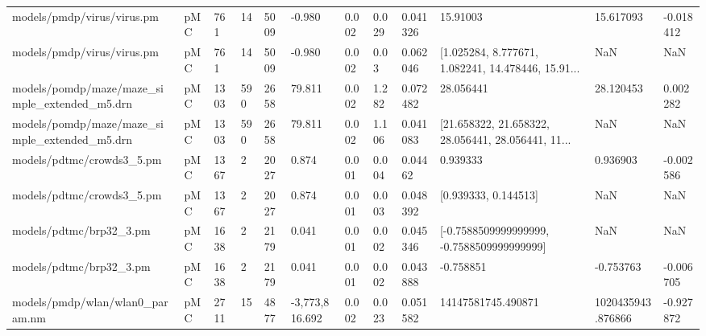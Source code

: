 \begin{tabular}{llllllllllll}
                        models/pmdp/virus/virus.pm &  pMC &    761 &         14 &        5009 &         -0.980 &            0.002 &                        0.029 &       0.041326 &                                           15.91003 &          15.617093 &    -0.018412 \\
                        models/pmdp/virus/virus.pm &  pMC &    761 &         14 &        5009 &         -0.980 &            0.002 &                         0.03 &       0.062046 & [1.025284, 8.777671, 1.082241, 14.478446, 15.91... &                NaN &          NaN \\
     models/pomdp/maze/maze\_simple\_extended\_m5.drn &  pMC &   1303 &        590 &        2658 &         79.811 &            0.002 &                        1.282 &       0.072482 &                                          28.056441 &          28.120453 &     0.002282 \\
     models/pomdp/maze/maze\_simple\_extended\_m5.drn &  pMC &   1303 &        590 &        2658 &         79.811 &            0.002 &                        1.106 &       0.041083 & [21.658322, 21.658322, 28.056441, 28.056441, 11... &                NaN &          NaN \\
                         models/pdtmc/crowds3\_5.pm &  pMC &   1367 &          2 &        2027 &          0.874 &            0.001 &                        0.004 &        0.04462 &                                           0.939333 &           0.936903 &    -0.002586 \\
                         models/pdtmc/crowds3\_5.pm &  pMC &   1367 &          2 &        2027 &          0.874 &            0.001 &                        0.003 &       0.048392 &                               [0.939333, 0.144513] &                NaN &          NaN \\
                           models/pdtmc/brp32\_3.pm &  pMC &   1638 &          2 &        2179 &          0.041 &            0.001 &                        0.002 &       0.045346 &         [-0.7588509999999999, -0.7588509999999999] &                NaN &          NaN \\
                           models/pdtmc/brp32\_3.pm &  pMC &   1638 &          2 &        2179 &          0.041 &            0.001 &                        0.002 &       0.043888 &                                          -0.758851 &          -0.753763 &    -0.006705 \\
                   models/pmdp/wlan/wlan0\_param.nm &  pMC &   2711 &         15 &        4877 & -3,773,816.692 &            0.002 &                        0.023 &       0.051582 &                                 14147581745.490871 &  1020435943.876866 &    -0.927872 \\

\end{tabular}
